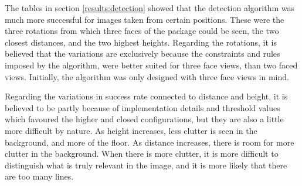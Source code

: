The tables in section \ref{results:detection} showed that the detection algorithm was much more successful for images taken from certain positions.
These were the three rotations from which three faces of the package could be seen, the two closest distances, and the two highest heights.
Regarding the rotations, it is believed that the variations are exclusively because the constraints and rules imposed by the algorithm, were better suited for three face views, than two faced views.
Initially, the algorithm was only designed with three face views in mind.

Regarding the variations in success rate connected to distance and height, it is believed to be partly because of implementation details and threshold values which favoured the higher and closed configurations, but they are also a little more difficult by nature.
As height increases, less clutter is seen in the background, and more of the floor.
As distance increases, there is room for more clutter in the background.
When there is more clutter, it is more difficult to distinguish what is truly relevant in the image, and it is more likely that there are too many lines.

%



